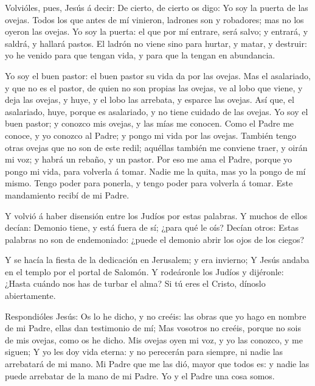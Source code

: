  Volvióles, pues, Jesús á decir: De cierto, de cierto os
digo: Yo soy la puerta de las ovejas.  Todos los que antes
de mí vinieron, ladrones son y robadores; mas no los oyeron las ovejas.
 Yo soy la puerta: el que por mí entrare, será salvo; y
entrará, y saldrá, y hallará pastos.  El ladrón no viene
sino para hurtar, y matar, y destruir: yo he venido para que tengan
vida, y para que la tengan en abundancia.

 Yo soy el buen pastor: el buen pastor su vida da por las
ovejas.  Mas el asalariado, y que no es el pastor, de quien
no son propias las ovejas, ve al lobo que viene, y deja las ovejas, y
huye, y el lobo las arrebata, y esparce las ovejas.  Así
que, el asalariado, huye, porque es asalariado, y no tiene cuidado de
las ovejas.  Yo soy el buen pastor; y conozco mis ovejas, y
las mías me conocen.  Como el Padre me conoce, y yo conozco
al Padre; y pongo mi vida por las ovejas.  También tengo
otras ovejas que no son de este redil; aquéllas también me conviene
traer, y oirán mi voz; y habrá un rebaño, y un pastor.  Por
eso me ama el Padre, porque yo pongo mi vida, para volverla á tomar.
 Nadie me la quita, mas yo la pongo de mí mismo. Tengo
poder para ponerla, y tengo poder para volverla á tomar. Este
mandamiento recibí de mi Padre.

 Y volvió á haber disensión entre los Judíos por estas
palabras.  Y muchos de ellos decían: Demonio tiene, y está
fuera de sí; ¿para qué le oís?  Decían otros: Estas
palabras no son de endemoniado: ¿puede el demonio abrir los ojos de los
ciegos?

 Y se hacía la fiesta de la dedicación en Jerusalem; y era
invierno;  Y Jesús andaba en el templo por el portal de
Salomón.  Y rodeáronle los Judíos y dijéronle: ¿Hasta
cuándo nos has de turbar el alma? Si tú eres el Cristo, dínoslo
abiertamente.

 Respondióles Jesús: Os lo he dicho, y no creéis: las obras
que yo hago en nombre de mi Padre, ellas dan testimonio de mí;
 Mas vosotros no creéis, porque no sois de mis ovejas, como
os he dicho.  Mis ovejas oyen mi voz, y yo las conozco, y
me siguen;  Y yo les doy vida eterna: y no perecerán para
siempre, ni nadie las arrebatará de mi mano.  Mi Padre que
me las dió, mayor que todos es: y nadie las puede arrebatar de la mano
de mi Padre.  Yo y el Padre una cosa somos.

